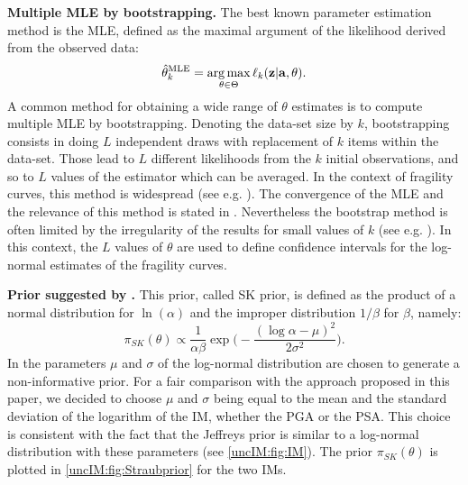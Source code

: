             {\bf Multiple MLE by bootstrapping.}
            The best known parameter estimation method is the MLE, defined as the maximal argument of the likelihood derived from the observed data:
            \begin{equation} \label{uncIM:eq:MLE}
                \hat\theta^{\mathrm{MLE}}_k = \operatorname*{arg\,max}_{\theta\in\Theta} \ell_k(\mathbf{z}|\mathbf{a}, \theta).
            \end{equation}
            A common method for obtaining a wide range of $\theta$  estimates is to compute multiple MLE by bootstrapping. Denoting the data-set size by $k$, bootstrapping consists in doing $L$ independent draws with replacement of $k$ items within the data-set. Those lead to $L$ different likelihoods from the $k$ initial observations, and so to $L$ values of the estimator which can be averaged. In the context of fragility curves, this method is widespread (see e.g. \cite{shinozuka_statistical_2000,lallemant_statistical_2015,gehl_influence_2015,baker_efficient_2015,wang_influence_2020}). The convergence of the MLE and the relevance of this method is stated in \cite{van_der_vaart_asymptotic_1992}. Nevertheless the bootstrap method is often limited by the irregularity of the results for small values of $k$ (see e.g. \cite{zentner_fragility_2017}). In this context, the $L$ values of $\theta$ are used to define confidence intervals for the log-normal estimates of the fragility curves.
 
        
        {\bf Prior suggested by \citet{straub_improved_2008}.}
        This prior, called SK prior, is defined as the product of a normal distribution for $\ln(\alpha)$ and the improper distribution $1/\beta$ for $\beta$, namely:
                \begin{equation} \label{uncIM:eq:Straubprior}
                    \pi_{SK}(\theta)\propto\frac{1}{\alpha\beta} \exp\Big( -\frac{(\log\alpha-\mu)^2}{2\sigma^2}\Big).
                \end{equation}
        In \cite{straub_improved_2008} the parameters $\mu$ and $\sigma$ of the log-normal distribution are chosen to generate a non-informative prior. For a fair comparison with the approach proposed in this paper, we decided to choose $\mu$ and $\sigma$ being equal to the mean and the standard deviation of the logarithm of the IM, whether the PGA or the PSA. This choice is consistent with the fact that the Jeffreys prior is similar to a log-normal distribution with these parameters (see \cref{uncIM:fig:IM}). The prior $\pi_{SK}(\theta)$ is plotted in \cref{uncIM:fig:Straubprior} for the two IMs.

